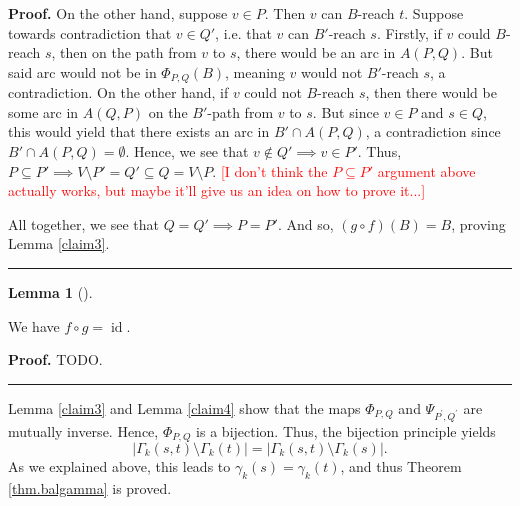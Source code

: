 \documentclass[numbers=enddot,12pt,final,onecolumn,notitlepage]{scrartcl}%
\theoremstyle{definition}
\newtheorem{lem}[theo]{Lemma}
\newenvironment{lemma}[1][]
{\begin{lem}[#1]\begin{leftbar}}
{\end{leftbar}\end{lem}}
\newenvironment{proof}[1][Proof]{\noindent\textbf{#1.} }{\ \rule{0.5em}{0.5em}}
\theoremstyle{plainsl}
\begin{document}
\begin{proof}
On the other hand, suppose $v \in P$. Then $v$ can $B$-reach $t$. Suppose towards contradiction that $v \in Q'$, i.e. that $v$ can $B'$-reach $s$. Firstly, if $v$ could $B$-reach $s$, then on the path from $v$ to $s$, there would be an arc in $A(P,Q)$. But said arc would not be in $\Phi_{P,Q}(B)$, meaning $v$ would not $B'$-reach $s$, a contradiction. On the other hand, if $v$ could not $B$-reach $s$, then there would be some arc in $A(Q,P)$ on the $B'$-path from $v$ to $s$. But since $v \in P$ and $s \in Q$, this would yield that there exists an arc in $B' \cap A(P,Q)$, a contradiction since $B' \cap A(P,Q) = \emptyset$. Hence, we see that $v \notin Q' \implies v \in P'$.
Thus, $P \subseteq P' \implies V \setminus P' =Q' \subseteq Q = V \setminus P$. \textcolor{red}{[I don't think the $P \subseteq P'$ argument above actually works, but maybe it'll give us an idea on how to prove it...]}

All together, we see that $Q = Q' \implies P = P'$. And so, $(g \circ f)(B) = B$, proving Lemma \ref{claim3}. 
\end{proof}

\begin{lemma}
    We have $f\circ g=\operatorname*{id}$.
\end{lemma}

\begin{proof}
\label{claim4}
    TODO.
\end{proof}

Lemma \ref{claim3} and Lemma \ref{claim4} show that the maps $\Phi_{P,Q}$ and $\Psi_{P^{\prime
},Q^{\prime}}$ are mutually inverse. Hence, $\Phi_{P,Q}$ is a bijection. Thus,
the bijection principle yields%
\[
\left\vert \Gamma_{k}\left(  s,t\right)  \setminus\Gamma_{k}\left(  t\right)
\right\vert =\left\vert \Gamma_{k}\left(  s,t\right)  \setminus\Gamma
_{k}\left(  s\right)  \right\vert .
\]
As we explained above, this leads to $\gamma_{k}\left(  s\right)  =\gamma
_{k}\left(  t\right)  $, and thus Theorem \ref{thm.balgamma} is proved.
\end{document}
